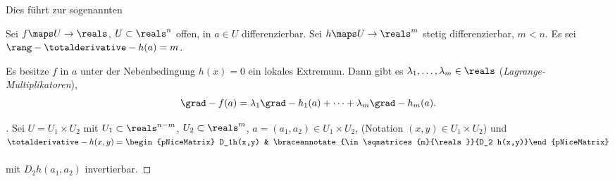 Dies führt zur sogenannten 
\begin{satz}
  Sei \( f\maps U\to \reals \), \( U\subset \reals^n \) offen, in \( a\in U \) differenzierbar. Sei \( h\maps U\to \reals^m \) stetig differenzierbar, \( m<n \). Es sei \( \rang-{\totalderivative-{h}(a)}=m \).

  Es besitze \( f \) in \( a \) unter der Nebenbedingung \( h(x)=0 \) ein lokales Extremum. Dann gibt es \( \lambda_1,\dotsc,\lambda_m\in \reals \) (\emph{Lagrange-Multiplikatoren}), \sd 
  \begin{equation*}
    \grad-{f(a)}=\lambda_1 \grad-{h_1(a)}+\dotsb+\lambda_m \grad-{h_m(a)}.
  \end{equation*}
\end{satz}
\begin{proof}[]
  Sei \obda \( U=U_1\times U_2 \) mit \( U_1\subset \reals^{n-m} \), \( U_2\subset \reals^m \), \( a=(a_1,a_2)\in U_1\times U_2 \), (Notation \( (x,y)\in U_1\times U_2 \)) und \( \totalderivative-{h}(x,y)=\begin{pNiceMatrix} D_1h(x,y) & \braceannotate{\in \sqmatrices{m}{\reals}}{D_2 h(x,y)}\end{pNiceMatrix}\vphantom{\underbrace{D_2 h(x,y)}_{\in \sqmatrices{m}{\reals}}} \) mit \( D_2h(a_1,a_2) \) invertierbar.
    

\end{proof}
